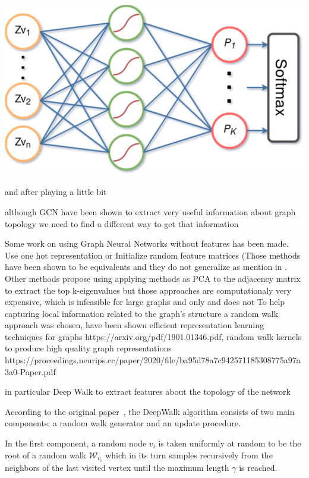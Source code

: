 \begin{center}
    \includegraphics[scale=0.5]{partitioning_module}
\end{center}

and after playing a little bit

although GCN have been shown to extract very useful information about graph topology we need to find a different way to get that information

Some work on using Graph Neural Networks without features has been made. Use one hot representation or Initialize random feature matrices (Those methods have been shown to be equivalents and they do not generalize as mention in \citep{hamilton}. Other methods propose using applying methods as PCA to the adjacency matrix to extract the top k-eigenvalues but those approaches are computationaly very expensive, which is infeasible for large graphs and only and does not
To help capturing local information related to the graph's structure a random walk approach was chosen, have been shown efficient representation learning techniques for graphs https://arxiv.org/pdf/1901.01346.pdf, random walk kernels to produce high quality graph representations https://proceedings.neurips.cc/paper/2020/file/ba95d78a7c942571185308775a97a3a0-Paper.pdf

in particular Deep Walk to extract features about the topology of the network

According to the original paper~\cite{deepwalk}, the DeepWalk algorithm consists of two main components: a random walk generator and an update procedure. 

In the first component, a random node $v_i$ is taken uniformly at random to be the root of a random walk $\mathcal W_{v_i}$ which in its turn samples recursively from the neighbors of the last visited vertex until the maximum length $\gamma$ is reached.

